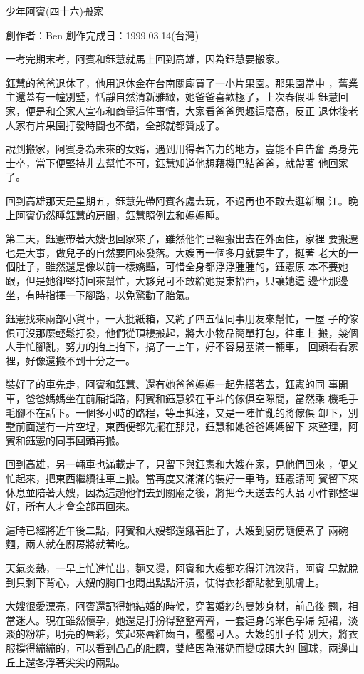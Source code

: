 



少年阿賓(四十六)搬家

創作者：Ben
創作完成日：1999.03.14(台灣)


一考完期末考，阿賓和鈺慧就馬上回到高雄，因為鈺慧要搬家。

鈺慧的爸爸退休了，他用退休金在台南關廟買了一小片果園。那果園當中
，舊業主還蓋有一幢別墅，恬靜自然清新雅緻，她爸爸喜歡極了，上次春假叫
鈺慧回家，便是和全家人宣布和商量這件事情，大家看爸爸興趣這麼高，反正
退休後老人家有片果園打發時間也不錯，全部就都贊成了。

說到搬家，阿賓身為未來的女婿，遇到用得著苦力的地方，豈能不自告奮
勇身先士卒，當下便堅持非去幫忙不可，鈺慧知道他想藉機巴結爸爸，就帶著
他回家了。

回到高雄那天是星期五，鈺慧先帶阿賓各處去玩，不過再也不敢去逛新堀
江。晚上阿賓仍然睡鈺慧的房間，鈺慧照例去和媽媽睡。

第二天，鈺憲帶著大嫂也回家來了，雖然他們已經搬出去在外面住，家裡
要搬遷也是大事，做兒子的自然要回來發落。大嫂再一個多月就要生了，挺著
老大的一個肚子，雖然還是像以前一樣嬌豔，可惜全身都浮浮腫腫的，鈺憲原
本不要她跟，但是她卻堅持回來幫忙，大夥兒可不敢給她提東抬西，只讓她這
邊坐那邊坐，有時指揮一下腳路，以免驚動了胎氣。

鈺憲找來兩部小貨車，一大批紙箱，又約了四五個同事朋友來幫忙，一屋
子的傢俱可沒那麼輕鬆打發，他們從頂樓搬起，將大小物品簡單打包，往車上
搬，幾個人手忙腳亂，努力的抬上抬下，搞了一上午，好不容易塞滿一輛車，
回頭看看家裡，好像還搬不到十分之一。

裝好了的車先走，阿賓和鈺慧、還有她爸爸媽媽一起先搭著去，鈺憲的同
事開車，爸爸媽媽坐在前廂指路，阿賓和鈺慧躲在車斗的傢俱空隙間，當然乘
機毛手毛腳不在話下。一個多小時的路程，等車抵達，又是一陣忙亂的將傢俱
卸下，別墅前面還有一片空埕，東西便都先擺在那兒，鈺慧和她爸爸媽媽留下
來整理，阿賓和鈺憲的同事回頭再搬。

回到高雄，另一輛車也滿載走了，只留下與鈺憲和大嫂在家，見他們回來
，便又忙起來，把東西繼續往車上搬。當再度又滿滿的裝好一車時，鈺憲請阿
賓留下來休息並陪著大嫂，因為這趟他們去到關廟之後，將把今天送去的大品
小件都整理好，所有人才會全部再回來。

這時已經將近午後二點，阿賓和大嫂都還餓著肚子，大嫂到廚房隨便煮了
兩碗麵，兩人就在廚房將就著吃。

天氣炎熱，一早上忙進忙出，麵又燙，阿賓和大嫂都吃得汗流浹背，阿賓
早就脫到只剩下背心，大嫂的胸口也悶出點點汗漬，使得衣衫都貼黏到肌膚上。

大嫂很愛漂亮，阿賓還記得她結婚的時候，穿著婚紗的曼妙身材，前凸後
翹，相當迷人。現在雖然懷孕，她還是打扮得整整齊齊，一套連身的米色孕婦
短裙，淡淡的粉粧，明亮的唇彩，笑起來唇紅齒白，靨靨可人。大嫂的肚子特
別大，將衣服撐得繃繃的，可以看到凸凸的肚臍，雙峰因為漲奶而變成碩大的
圓球，兩邊山丘上還各浮著尖尖的兩點。

